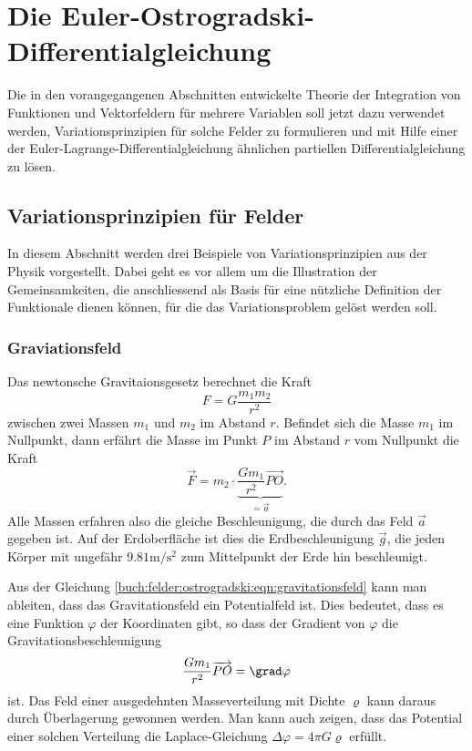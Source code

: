 %
%
%
\section{Die Euler-Ostrogradski-Differentialgleichung
\label{buch:felder:section:euler-ostrogradski}}
Die in den vorangegangenen Abschnitten entwickelte Theorie der
Integration von Funktionen und Vektorfeldern für mehrere Variablen
soll jetzt dazu verwendet werden, Variationsprinzipien für solche
Felder zu formulieren und mit Hilfe einer der
Euler-Lagrange-Differentialgleichung ähnlichen partiellen
Differentialgleichung zu lösen.

% 
%
\subsection{Variationsprinzipien für Felder}
In diesem Abschnitt werden drei Beispiele von Variationsprinzipien aus
der Physik vorgestellt.
Dabei geht es vor allem um die Illustration der Gemeinsamkeiten,
die anschliessend als Basis für eine nützliche Definition der
Funktionale dienen können, für die das Variationsproblem gelöst
werden soll.

%
%
\subsubsection{Graviationsfeld}
Das newtonsche Gravitaionsgesetz berechnet die Kraft
\[
F = G \frac{m_1m_2}{r^2}
\]
zwischen zwei Massen $m_1$ und $m_2$ im Abstand $r$.
Befindet sich die Masse $m_1$ im Nullpunkt, dann erfährt die Masse im
Punkt $P$ im Abstand $r$ vom Nullpunkt die Kraft 
\begin{equation}
\vec{F}
=
m_2
\cdot
\underbrace{\frac{Gm_1}{r^2} \overrightarrow{PO}}_{\displaystyle =\vec{a}}.
\label{buch:felder:ostrogradski:eqn:gravitationsfeld}
\end{equation}
Alle Massen erfahren also die gleiche Beschleunigung, die durch das
Feld $\vec{a}$ gegeben ist.
Auf der Erdoberfläche ist dies die Erdbeschleunigung $\vec{g}$, die jeden
Körper mit ungefähr $9.81 \text{m}/\text{s}^2$ zum Mittelpunkt der
Erde hin beschleunigt.

Aus der Gleichung \eqref{buch:felder:ostrogradski:eqn:gravitationsfeld}
kann man ableiten, dass das Gravitationsfeld ein Potentialfeld ist.
Dies bedeutet, dass es eine Funktion $\varphi$ der Koordinaten gibt, 
so dass der Gradient von $\varphi$ die Gravitationsbeschleunigung
\[
\frac{Gm_1}{r^2}\overrightarrow{PO}
=
\grad\varphi
\]
ist.
Das Feld einer ausgedehnten Masseverteilung mit Dichte $\varrho$
kann daraus durch Überlagerung gewonnen werden.
Man kann auch zeigen, dass das Potential einer solchen Verteilung
die Laplace-Gleichung $\Delta \varphi = 4\pi G \varrho$ erfüllt.

